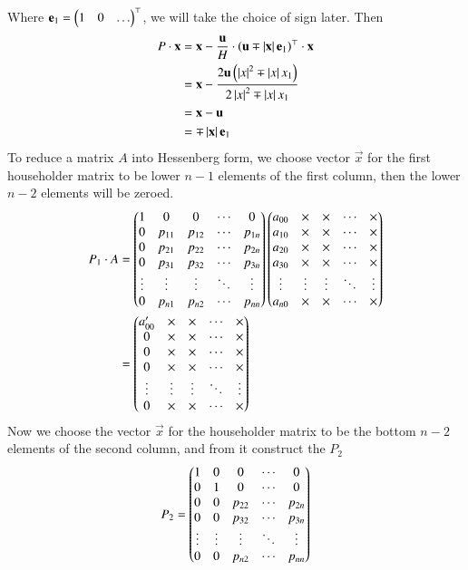 \documentclass[journal]{IEEEtran}
\begin{document}
	Where $\mathbf{e}_1 = \begin{pmatrix}1 & 0 & \dots\end{pmatrix}^\top$, we will take the choice of sign later. Then
	\begin{align}
		P\cdot\mathbf{x} &= \mathbf{x} - \frac{\mathbf{u}}{H}\cdot\left(\mathbf{u}\mp \left\vert\mathbf{x}\right\vert\mathbf{e}_1\right)^\top\cdot \mathbf{x}\\
		&= \mathbf{x} - \frac{2\mathbf{u}\left(\left\vert x\right\vert^2\mp \left\vert x\right\vert x_1\right)}{2\left\vert x\right\vert^2\mp \left\vert x\right\vert x_1}\\
		&= \mathbf{x} - \mathbf{u}\\
		&= \mp\left\vert\mathbf{x}\right\vert\mathbf{e}_1
	\end{align}
	To reduce a matrix $A$ into Hessenberg form, we choose vector $\vec{x}$ for the first householder matrix to be lower $n-1$ elements of the first column, then the lower $n-2$ elements will be zeroed.
	\begin{align}
		P_1\cdot A &= \begin{pmatrix}
			1 & 0 & 0 & \cdots & 0 \\
			0 & p_{11} & p_{12} & \cdots & p_{1n} \\
			0      & p_{21} & p_{22} & \cdots & p_{2n} \\
			0      & p_{31} & p_{32} & \cdots & p_{3n} \\
			\vdots & \vdots & \vdots & \ddots & \vdots \\
			0      & p_{n1} & p_{n2} & \cdots & p_{nn}
		\end{pmatrix}\begin{pmatrix}
			a_{00} & \times & \times & \cdots & \times \\
			a_{10} & \times & \times & \cdots & \times \\
			a_{20} & \times & \times & \cdots & \times \\
			a_{30} & \times & \times & \cdots & \times \\
			\vdots & \vdots & \vdots & \ddots & \vdots \\
			a_{n0} & \times & \times & \cdots & \times
		\end{pmatrix}\\
		&=\begin{pmatrix}
			a_{00}^\prime & \times & \times & \cdots & \times \\
			0 & \times & \times & \cdots & \times \\
			0      & \times & \times & \cdots & \times \\
			0      & \times   & \times & \cdots & \times \\
			\vdots & \vdots & \vdots & \ddots & \vdots \\
			0      & \times      & \times      & \cdots & \times
		\end{pmatrix}
	\end{align}
	Now we choose the vector $\vec{x}$ for the householder matrix to be the bottom $n-2$ elements of the second column, and from it construct the $P_2$
	\begin{align}
		P_2 = \begin{pmatrix}
			1 & 0 & 0 & \cdots & 0 \\
			0 & 1 & 0 & \cdots & 0 \\
			0 & 0 & p_{22} & \cdots & p_{2n} \\
			0 & 0 & p_{32} & \cdots & p_{3n} \\
			\vdots & \vdots & \vdots & \ddots & \vdots \\
			0 & 0 & p_{n2} & \cdots & p_{nn}
		\end{pmatrix}
	\end{align}
\end{document}
